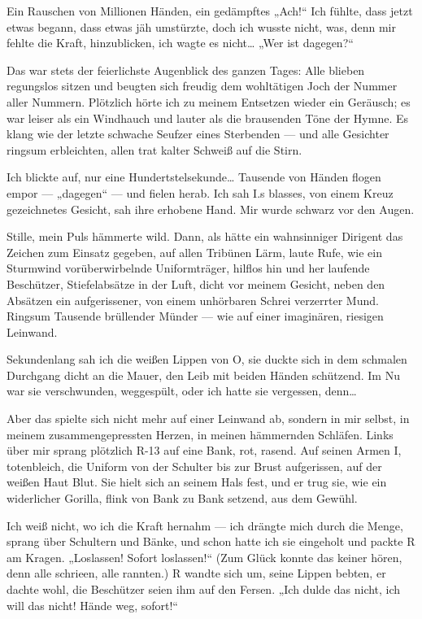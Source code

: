 Ein Rauschen von Millionen Händen, ein gedämpftes „Ach!“ Ich
fühlte, dass jetzt etwas begann, dass etwas jäh umstürzte, doch ich
wusste nicht, was, denn mir fehlte die Kraft, hinzublicken, ich
wagte es nicht\ldots{} „Wer ist dagegen?“

Das war stets der feierlichste Augenblick des ganzen Tages: Alle
blieben regungslos sitzen und beugten sich freudig dem wohltätigen
Joch der Nummer aller Nummern. Plötzlich hörte ich zu meinem
Entsetzen wieder ein Geräusch; es war leiser als ein Windhauch und
lauter als die brausenden Töne der Hymne. Es klang wie der letzte
schwache Seufzer eines Sterbenden — und alle Gesichter ringsum
erbleichten, allen trat kalter Schweiß auf die Stirn.

Ich blickte auf, nur eine Hundertstelsekunde\ldots{} Tausende von Händen
flogen empor — „dagegen“ — und fielen herab. Ich sah I.s blasses,
von einem Kreuz gezeichnetes Gesicht, sah ihre erhobene Hand. Mir
wurde schwarz vor den Augen.

Stille, mein Puls hämmerte wild. Dann, als hätte ein wahnsinniger
Dirigent das Zeichen zum Einsatz gegeben, auf allen Tribünen Lärm,
laute Rufe, wie ein Sturmwind vorüberwirbelnde Uniformträger,
hilflos hin und her
laufende Beschützer, Stiefelabsätze in der Luft, dicht vor meinem
Gesicht, neben den Absätzen ein aufgerissener, von einem unhörbaren
Schrei verzerrter Mund. Ringsum Tausende brüllender Münder — wie
auf einer imaginären, riesigen Leinwand.

Sekundenlang sah ich die weißen Lippen von O, sie duckte sich in
dem schmalen Durchgang dicht an die Mauer, den Leib mit beiden
Händen schützend. Im Nu war sie verschwunden, weggespült, oder ich
hatte sie vergessen, denn\ldots{}

Aber das spielte sich nicht mehr auf einer Leinwand ab, sondern in
mir selbst, in meinem zusammengepressten Herzen, in meinen
hämmernden Schläfen. Links über mir sprang plötzlich R-13 auf eine
Bank, rot, rasend. Auf seinen Armen I, totenbleich, die Uniform von
der Schulter bis zur Brust aufgerissen, auf der weißen Haut Blut.
Sie hielt sich an seinem Hals fest, und er trug sie, wie ein
widerlicher Gorilla, flink von Bank zu Bank setzend, aus dem
Gewühl.

Ich weiß nicht, wo ich die Kraft hernahm — ich drängte mich durch
die Menge, sprang über Schultern und Bänke, und schon hatte ich sie
eingeholt und packte R am Kragen. „Loslassen! Sofort loslassen!“
(Zum Glück konnte das keiner hören, denn alle schrieen, alle
rannten.) R wandte sich um, seine Lippen bebten, er dachte wohl,
die Beschützer seien ihm auf den Fersen. „Ich dulde das nicht, ich
will das nicht! Hände weg, sofort!“

